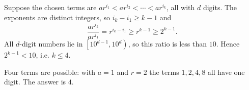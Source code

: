Suppose the chosen terms are $ar^{i_1}<ar^{i_2}<\cdots<ar^{i_k}$, all with $d$ digits. The exponents are distinct integers, so $i_k-i_1\ge k-1$ and
\[\dfrac{ar^{i_k}}{ar^{i_1}}=r^{i_k-i_1}\ge r^{k-1}\ge2^{k-1}.\]
All $d$-digit numbers lie in $\left[10^{d-1},10^d\right)$, so this ratio is less than $10$. Hence $2^{k-1}<10$, i.e. $k\le4$.

Four terms are possible: with $a=1$ and $r=2$ the terms $1,2,4,8$ all have one digit. The answer is $\boxed{4}$.
